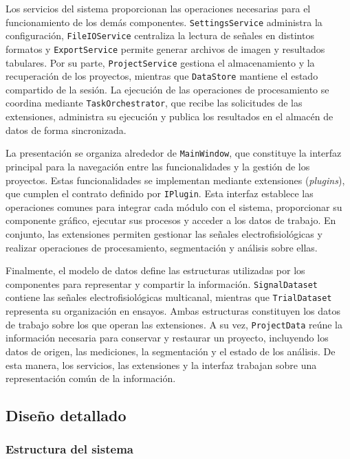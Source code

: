 \documentclass[12pt,letterpaper,oneside]{article}
\begin{document}
Los servicios del sistema proporcionan las operaciones necesarias para el funcionamiento de los demás componentes. \texttt{SettingsService} administra la configuración, \texttt{FileIOService} centraliza la lectura de señales en distintos formatos y \texttt{ExportService} permite generar archivos de imagen y resultados tabulares. Por su parte, \texttt{ProjectService} gestiona el almacenamiento y la recuperación de los proyectos, mientras que \texttt{DataStore} mantiene el estado compartido de la sesión. La ejecución de las operaciones de procesamiento se coordina mediante \texttt{TaskOrchestrator}, que recibe las solicitudes de las extensiones, administra su ejecución y publica los resultados en el almacén de datos de forma sincronizada.

La presentación se organiza alrededor de \texttt{MainWindow}, que constituye la interfaz principal para la navegación entre las funcionalidades y la gestión de los proyectos. Estas funcionalidades se implementan mediante extensiones (\textit{plugins}), que cumplen el contrato definido por \texttt{IPlugin}. Esta interfaz establece las operaciones comunes para integrar cada módulo con el sistema, proporcionar su componente gráfico, ejecutar sus procesos y acceder a los datos de trabajo. En conjunto, las extensiones permiten gestionar las señales electrofisiológicas y realizar operaciones de procesamiento, segmentación y análisis sobre ellas.

Finalmente, el modelo de datos define las estructuras utilizadas por los componentes para representar y compartir la información. \texttt{SignalDataset} contiene las señales electrofisiológicas multicanal, mientras que \texttt{TrialDataset} representa su organización en ensayos. Ambas estructuras constituyen los datos de trabajo sobre los que operan las extensiones. A su vez, \texttt{ProjectData} reúne la información necesaria para conservar y restaurar un proyecto, incluyendo los datos de origen, las mediciones, la segmentación y el estado de los análisis. De esta manera, los servicios, las extensiones y la interfaz trabajan sobre una representación común de la información.

\subsection{Diseño detallado}

\subsubsection{Estructura del sistema}
\end{document}
